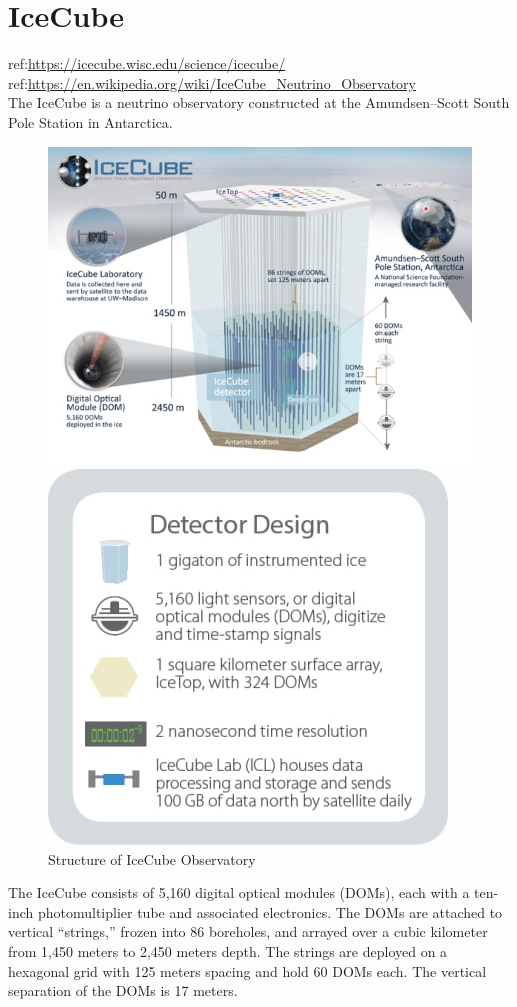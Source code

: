 \documentclass{report}
\begin{document}
\section{\large IceCube}
ref:\url{https://icecube.wisc.edu/science/icecube/}
\\
ref:\url{https://en.wikipedia.org/wiki/IceCube_Neutrino_Observatory}\\
The IceCube is a neutrino observatory constructed at the Amundsen–Scott South Pole Station in Antarctica.

\begin{figure}[htbp] %
	\centering
	\begin{minipage}{.5\textwidth}
		\centering
		\includegraphics[width=0.8\linewidth]{Images/icecube_detector_schematic.jpg}
	\end{minipage}%
	\begin{minipage}{.5\textwidth}
		\centering
		\includegraphics[width=0.65\linewidth]{Images/icecube_detector_design.jpg}
	\end{minipage}
	\caption*{Structure of IceCube Observatory}
\end{figure}
The %
IceCube consists of 5,160 digital optical modules (DOMs), each with a ten-inch photomultiplier tube and associated electronics. The DOMs are attached to vertical “strings,” frozen into 86 boreholes, and arrayed over a cubic kilometer from 1,450 meters to 2,450 meters depth. The strings are deployed on a hexagonal grid with 125 meters spacing and hold 60 DOMs each. The vertical separation of the DOMs is 17 meters.
\end{document}
